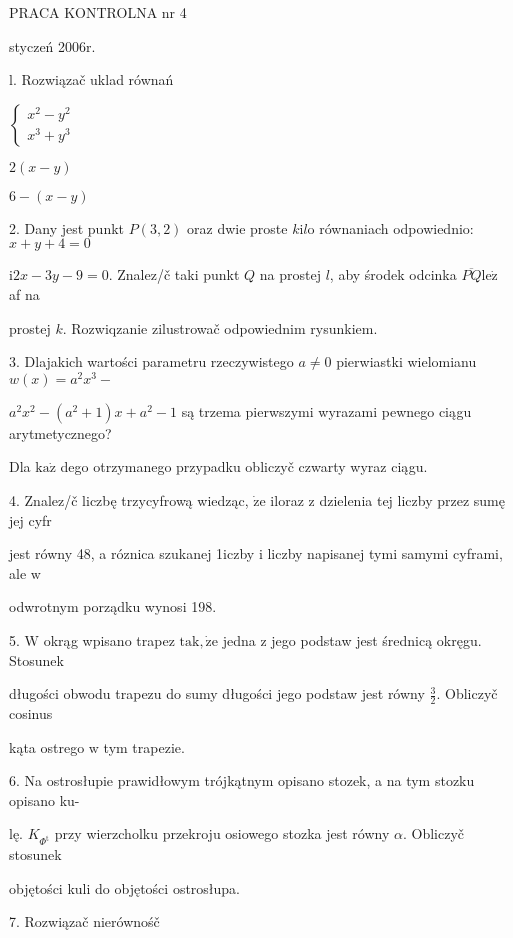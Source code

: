\documentclass[a4paper,12pt]{article}
\begin{document}
PRACA KONTROLNA nr 4

styczeń 2006r.

l. Rozwiązač uklad równań

$\left\{\begin{array}{l}
x^{2}-y^{2}\\
x^{3}+y^{3}
\end{array}\right.$

$2(x-y)$

$6-(x-y)$

2. Dany jest punkt $P(3,2)$ oraz dwie proste $k\mathrm{i}l\mathrm{o}$ równaniach odpowiednio: $x+y+4=0$

$\mathrm{i}2x-3y-9=0$. Znalez/č taki punkt $Q$ na prostej $l$, aby środek odcinka $\overline{PQ}\mathrm{l}\mathrm{e}\dot{\mathrm{z}}$ af na

prostej $k$. Rozwiqzanie zilustrowač odpowiednim rysunkiem.

3. Dlajakich wartości parametru rzeczywistego $a\neq 0$ pierwiastki wielomianu $w(x)=a^{2}x^{3}-$

$a^{2}x^{2}-(a^{2}+1)x+a^{2}-1$ są trzema pierwszymi wyrazami pewnego ciągu arytmetycznego?

Dla $\mathrm{k}\mathrm{a}\dot{\mathrm{z}}$ dego otrzymanego przypadku obliczyč czwarty wyraz ciągu.

4. Znalez/č liczbę trzycyfrową wiedząc, $\dot{\mathrm{z}}\mathrm{e}$ iloraz $\mathrm{z}$ dzielenia tej liczby przez sumę jej cyfr

jest równy 48, a róznica szukanej 1iczby $\mathrm{i}$ liczby napisanej tymi samymi cyframi, ale $\mathrm{w}$

odwrotnym porządku wynosi 198.

5. $\mathrm{W}$ okrąg wpisano trapez $\mathrm{t}\mathrm{a}\mathrm{k}, \dot{\mathrm{z}}\mathrm{e}$ jedna $\mathrm{z}$ jego podstaw jest średnicą okręgu. Stosunek

długości obwodu trapezu do sumy długości jego podstaw jest równy $\displaystyle \frac{3}{2}$. Obliczyč cosinus

kąta ostrego $\mathrm{w}$ tym trapezie.

6. Na ostrosłupie prawidłowym trójkątnym opisano stozek, a na tym stozku opisano ku-

lę. $K_{\Phi^{\mathrm{t}}}$ przy wierzcholku przekroju osiowego stozka jest równy $\alpha$. Obliczyč stosunek

objętości kuli do objętości ostrosłupa.

7. Rozwiązač nierównośč
\end{document}
